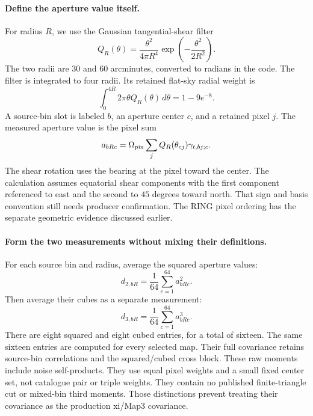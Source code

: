\documentclass[11pt]{article}
\begin{document}
\paragraph{Define the aperture value itself.}
For radius $R$, we use the Gaussian tangential-shear filter
\begin{equation}
 Q_R(\theta)=\frac{\theta^2}{4\pi R^4}
             \exp\left(-\frac{\theta^2}{2R^2}\right).
\end{equation}
The two radii are 30 and 60 arcminutes, converted to radians in the code.
The filter is integrated to four radii. Its retained flat-sky radial weight is
\begin{equation}
 \int_0^{4R}2\pi\theta Q_R(\theta)\,d\theta
 =1-9e^{-8}.
\end{equation}
A source-bin slot is labeled $b$, an aperture center $c$, and a retained
pixel $j$. The measured aperture value is the pixel sum
\begin{equation}
 a_{bRc}=\Omega_{\rm pix}\sum_j Q_R(\theta_{cj})\gamma_{t,bj;c}.
\end{equation}
The shear rotation uses the bearing at the pixel toward the center. The
calculation assumes equatorial shear components with the first component
referenced to east and the second to $45$ degrees toward north. That sign
and basis convention still needs producer confirmation. The RING pixel
ordering has the separate geometric evidence discussed earlier.

\paragraph{Form the two measurements without mixing their definitions.}
For each source bin and radius, average the squared aperture values:
\begin{equation}
 d_{2,bR}=\frac{1}{64}\sum_{c=1}^{64}a_{bRc}^2.
\end{equation}
Then average their cubes as a separate measurement:
\begin{equation}
 d_{3,bR}=\frac{1}{64}\sum_{c=1}^{64}a_{bRc}^3.
\end{equation}
There are eight squared and eight cubed entries, for a total of sixteen.
The same sixteen entries are computed for every selected map. Their full
covariance retains source-bin correlations and the squared/cubed cross
block. These raw moments include noise self-products. They use equal pixel
weights and a small fixed center set, not catalogue pair or triple weights.
They contain no published finite-triangle cut or mixed-bin third moments.
Those distinctions prevent treating their covariance as the production
xi/Map3 covariance.
\end{document}
